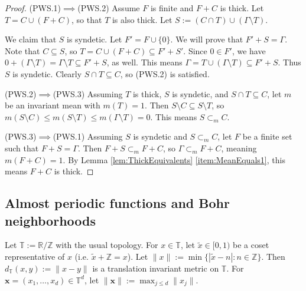 \documentclass[12pt]{amsart} \usepackage{amsmath,centernot,amssymb,leftindex}
\newcommand{\mb}{\mathbf}
\numberwithin{theorem}{section}
\numberwithin{equation}{section}
\theoremstyle{definition}
\begin{document}
\begin{proof}
\noindent (PWS.1)$\implies$(PWS.2)  Assume $F$ is finite and $F+C$ is thick.   Let $T=C\cup (F+C)$, so that $T$ is also thick.  Let $S:= (C\cap T) \cup (\Gamma \setminus T)$.  

We claim that $S$ is syndetic.  Let $F'=F\cup \{0\}$. We will prove that $F'+S=\Gamma$.  Note that $C\subseteq S$, so $T=C\cup (F+C)\subseteq F'+S'$.  Since $0\in F'$, we have $0+(\Gamma\setminus T)=\Gamma\setminus T\subseteq F'+S$, as well.  This means $\Gamma = T\cup (\Gamma \setminus T)\subseteq F'+S$.  Thus $S$ is syndetic. Clearly $S\cap T \subseteq C$, so (PWS.2) is satisfied.





\noindent  (PWS.2)$\implies$(PWS.3)  Assuming $T$ is thick, $S$ is syndetic, and $S\cap T\subseteq C$, let $m$ be an invariant mean with $m(T)=1$.  Then $S\setminus C\subseteq S \setminus T$, so $m(S\setminus C)\leq m(S\setminus T)\leq m(\Gamma \setminus T)=0$.  This means $S\subset_{m} C$. 

\noindent (PWS.3)$\implies$(PWS.1) Assuming $S$ is syndetic and $S\subset_{m} C$, let $F$ be a finite set such that $F+S=\Gamma$.  Then $F+S\subset_{m} F+C$, so $\Gamma \subset_{m} F+C$, meaning $m(F+C)=1$.  By Lemma \ref{lem:ThickEquivalents} \ref{item:MeanEquals1}, this means $F+C$ is thick.  \end{proof}




	
	
	\subsection{Almost periodic functions and Bohr neighborhoods}\label{sec:BohrNhoods}
	
	
	Let $\mathbb T:=\mathbb R/\mathbb Z$ with the usual topology.  For $x\in \mathbb T$, let $\tilde{x}\in [0,1)$ be a coset representative of $x$ (i.e. $\tilde{x}+\mathbb Z = x$).  Let $\|x\|:=\min\{|\tilde{x}-n|:n\in \mathbb Z\}$.  Then $d_{\mathbb T}(x,y):=\|x-y\|$ is a translation invariant metric on $\mathbb T$.  For $\mb x = (x_1,\dots,x_d)\in \mathbb T^d$, let $\|\mb x\|:=\max_{j\leq d} \|x_j\|$.
	
\end{document}
